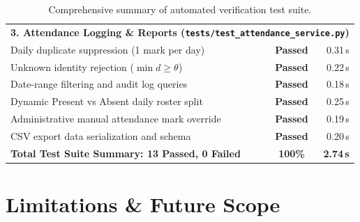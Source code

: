 \documentclass[12pt,a4paper]{article}
\begin{document}
\begin{table}[htbp]
\begin{tabularx}{\textwidth}{X c r}
\midrule
\multicolumn{3}{l}{\textbf{\color{vitblue}3. Attendance Logging \& Reports (\texttt{tests/test\_attendance\_service.py})}} \\
\hspace{0.3cm} Daily duplicate suppression (1 mark per day) & \color{green!60!black}\textbf{Passed} & 0.31\,s \\
\hspace{0.3cm} Unknown identity rejection ($\min d \geq \theta$) & \color{green!60!black}\textbf{Passed} & 0.22\,s \\
\hspace{0.3cm} Date-range filtering and audit log queries & \color{green!60!black}\textbf{Passed} & 0.18\,s \\
\hspace{0.3cm} Dynamic Present vs Absent daily roster split & \color{green!60!black}\textbf{Passed} & 0.25\,s \\
\hspace{0.3cm} Administrative manual attendance mark override & \color{green!60!black}\textbf{Passed} & 0.19\,s \\
\hspace{0.3cm} CSV export data serialization and schema & \color{green!60!black}\textbf{Passed} & 0.20\,s \\
\midrule
\rowcolor{green!15}
\textbf{Total Test Suite Summary: 13 Passed, 0 Failed} & \textbf{100\%} & \textbf{2.74\,s} \\
\bottomrule
\end{tabularx}
\caption{Comprehensive summary of automated verification test suite.}
\label{tab:pytest_results}
\end{table}


\section{Limitations \& Future Scope}
\label{sec:limitations}
\end{document}
